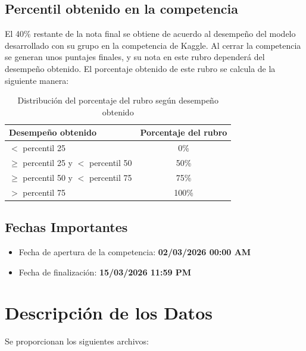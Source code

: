 \documentclass{article}
\begin{document}
\subsection{Percentil obtenido en la competencia}
El 40\% restante de la nota final se obtiene de acuerdo al desempeño del modelo desarrollado con su grupo en la competencia de Kaggle. Al cerrar la competencia se generan unos puntajes finales, y su nota en este rubro dependerá del desempeño obtenido. El porcentaje obtenido de este rubro se calcula de la siguiente manera:

\begin{table}[H]
\centering
\begin{tabular}{|l|c|}
\hline
\textbf{Desempeño obtenido} & \textbf{Porcentaje del rubro} \\ \hline
$<$ percentil 25 & 0\% \\ \hline
$\geq$ percentil 25 y $<$ percentil 50 & 50\% \\ \hline
$\geq$ percentil 50 y $<$ percentil 75 & 75\% \\ \hline
$>$ percentil 75 & 100\% \\ \hline
\end{tabular}
\caption{Distribución del porcentaje del rubro según desempeño obtenido}
\end{table}



\subsection{Fechas Importantes}
\begin{itemize}
    \item Fecha de apertura de la competencia: \textbf{02/03/2026 00:00 AM}
    \item Fecha de finalización: \textbf{15/03/2026 11:59 PM}
\end{itemize}

\section{Descripción de los Datos}
Se proporcionan los siguientes archivos:
\end{document}

